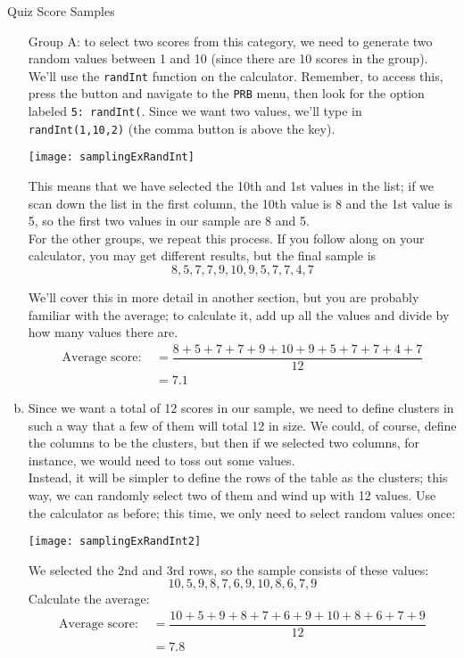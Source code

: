 \begin{example}[https://www.youtube.com/watch?v=Ix-PKoZrJks&list=PLfmpjsIzhzttL_Uec2nCbDRcAcUF7NKG8&index=5]{Quiz Score Samples}
\begin{enumerate}[(a)]
Group A: to select two scores from this category, we need to generate two random values between 1 and 10 (since there are 10 scores in the group).  We'll use the \texttt{randInt} function on the calculator.  Remember, to access this, press the  button and navigate to the \texttt{PRB} menu, then look for the option labeled \texttt{5: randInt(}.  Since we want two values, we'll type in \texttt{randInt(1,10,2)} (the comma button is above the  key).
\begin{center}
\texttt{[image: samplingExRandInt]}
\end{center}
This means that we have selected the 10th and 1st values in the list; if we scan down the list in the first column, the 10th value is 8 and the 1st value is 5, so the first two values in our sample are 8 and 5.\\

For the other groups, we repeat this process.  If you follow along on your calculator, you may get different results, but the final sample is
\[\boxed{8, 5, 7, 7, 9, 10, 9, 5, 7, 7, 4, 7}\]

We'll cover this in more detail in another section, but you are probably familiar with the average; to calculate it, add up all the values and divide by how many values there are.
\begin{align*}
\textrm{Average score: } &= \dfrac{8+5+7+7+9+10+9+5+7+7+4+7}{12}\\
&= \boxed{7.1}
\end{align*}

\item Since we want a total of 12 scores in our sample, we need to define clusters in such a way that a few of them will total 12 in size.  We could, of course, define the columns to be the clusters, but then if we selected two columns, for instance, we would need to toss out some values.\\

Instead, it will be simpler to define the rows of the table as the clusters; this way, we can randomly select two of them and wind up with 12 values.  Use the calculator as before; this time, we only need to select random values once:
\begin{center}
\texttt{[image: samplingExRandInt2]}
\end{center}
We selected the 2nd and 3rd rows, so the sample consists of these values:
\[\boxed{10, 5, 9, 8, 7, 6, 9 ,10, 8, 6, 7, 9}\]
Calculate the average:
\begin{align*}
\textrm{Average score: } &= \dfrac{10+5+9+8+7+6+9+10+8+6+7+9}{12}\\
&= \boxed{7.8}
\end{align*}


\end{enumerate}
\end{example}

